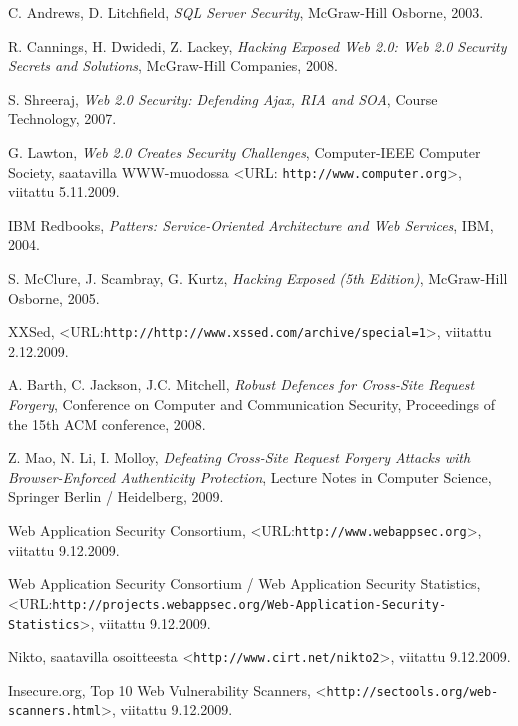\begin{thebibliography}{99}
C. Andrews, D. Litchfield, \textit{SQL Server Security}, McGraw-Hill Osborne, 2003.

R. Cannings, H. Dwidedi, Z. Lackey, \textit{Hacking Exposed Web 2.0: Web 2.0 Security Secrets and Solutions}, McGraw-Hill Companies, 2008.

S. Shreeraj, \textit{Web 2.0 Security: Defending Ajax, RIA and SOA}, Course Technology, 2007.

G. Lawton, \textit{Web 2.0 Creates Security Challenges}, Computer-IEEE Computer Society, saatavilla WWW-muodossa <URL: \texttt{http://www.computer.org}>,
viitattu 5.11.2009.

IBM Redbooks, \textit{Patters: Service-Oriented Architecture and Web Services}, IBM, 2004.

S. McClure, J. Scambray, G. Kurtz, \textit{Hacking Exposed (5th Edition)}, McGraw-Hill Osborne, 2005.

XXSed, <URL:\texttt{http://http://www.xssed.com/archive/special=1}>, viitattu 2.12.2009.

A. Barth, C. Jackson, J.C. Mitchell, \textit{Robust Defences for Cross-Site Request Forgery}, Conference on Computer and Communication Security, 
Proceedings of the 15th ACM conference, 2008.

Z. Mao, N. Li, I. Molloy, \textit{Defeating Cross-Site Request Forgery Attacks with Browser-Enforced Authenticity Protection}, Lecture Notes in Computer Science,
Springer Berlin / Heidelberg, 2009.

Web Application Security Consortium, <URL:\texttt{http://www.webappsec.org}>, viitattu 9.12.2009.

Web Application Security Consortium / Web Application Security Statistics, <URL:\texttt{http://projects.webappsec.org/Web-Application-Security-Statistics}>, 
viitattu 9.12.2009.

Nikto, saatavilla osoitteesta <\texttt{http://www.cirt.net/nikto2}>, viitattu 9.12.2009.

Insecure.org, Top 10 Web Vulnerability Scanners, <\texttt{http://sectools.org/web-scanners.html}>, viitattu 9.12.2009.

\end{thebibliography}
